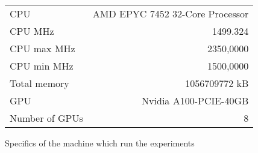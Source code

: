 \begin{figure}[h]
\centering
\begin{tabular}{|l  |r|}
 \hline
CPU & AMD EPYC 7452 32-Core Processor\\
CPU MHz&                     1499.324\\
CPU max MHz&                     2350,0000\\
CPU min MHz&                     1500,0000\\
Total memory&       1056709772 kB\\
GPU&    Nvidia A100-PCIE-40GB\\
Number of GPUs & 8\\
\hline
\end{tabular}
\caption{Specifics of the machine which run the experiments}
\label{fig:gpu_info}
\end{figure}






